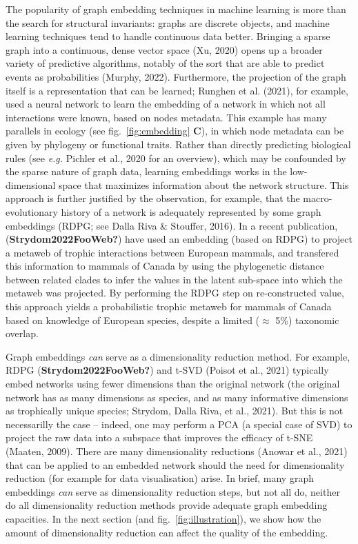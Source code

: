 \documentclass[10pt,oneside]{article}
\begin{document}
The popularity of graph embedding techniques in machine learning is more
than the search for structural invariants: graphs are discrete objects,
and machine learning techniques tend to handle continuous data better.
Bringing a sparse graph into a continuous, dense vector space (Xu, 2020)
opens up a broader variety of predictive algorithms, notably of the sort
that are able to predict events as probabilities (Murphy, 2022).
Furthermore, the projection of the graph itself is a representation that
can be learned; Runghen et al. (2021), for example, used a neural
network to learn the embedding of a network in which not all
interactions were known, based on nodes metadata. This example has many
parallels in ecology (see fig.~\ref{fig:embedding} \textbf{C}), in which
node metadata can be given by phylogeny or functional traits. Rather
than directly predicting biological rules (see \emph{e.g.} Pichler et
al., 2020 for an overview), which may be confounded by the sparse nature
of graph data, learning embeddings works in the low-dimensional space
that maximizes information about the network structure. This approach is
further justified by the observation, for example, that the
macro-evolutionary history of a network is adequately represented by
some graph embeddings (RDPG; see Dalla Riva \& Stouffer, 2016). In a
recent publication, (\textbf{Strydom2022FooWeb?}) have used an embedding
(based on RDPG) to project a metaweb of trophic interactions between
European mammals, and transfered this information to mammals of Canada
by using the phylogenetic distance between related clades to infer the
values in the latent sub-space into which the metaweb was projected. By
performing the RDPG step on re-constructed value, this approach yields a
probabilistic trophic metaweb for mammals of Canada based on knowledge
of European species, despite a limited (\(\approx\) 5\%) taxonomic
overlap.

Graph embeddings \emph{can} serve as a dimensionality reduction method.
For example, RDPG (\textbf{Strydom2022FooWeb?}) and t-SVD (Poisot et
al., 2021) typically embed networks using fewer dimensions than the
original network (the original network has as many dimensions as
species, and as many informative dimensions as trophically unique
species; Strydom, Dalla Riva, et al., 2021). But this is not
necessarilly the case -- indeed, one may perform a PCA (a special case
of SVD) to project the raw data into a subspace that improves the
efficacy of t-SNE (Maaten, 2009). There are many dimensionality
reductions (Anowar et al., 2021) that can be applied to an embedded
network should the need for dimensionality reduction (for example for
data visualisation) arise. In brief, many graph embeddings \emph{can}
serve as dimensionality reduction steps, but not all do, neither do all
dimensionality reduction methods provide adequate graph embedding
capacities. In the next section (and fig.~\ref{fig:illustration}), we
show how the amount of dimensionality reduction can affect the quality
of the embedding.
\end{document}
